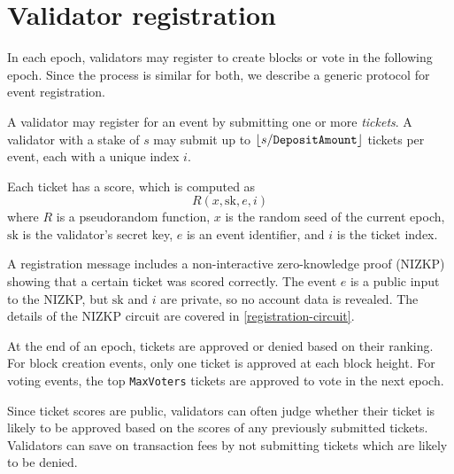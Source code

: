 \section{Validator registration}
\label{registration}


In each epoch, validators may register to create blocks or vote in the following epoch. Since the process is similar for both, we describe a generic protocol for event registration.

A validator may register for an event by submitting one or more \emph{tickets}. A validator with a stake of $s$ may submit up to $\lfloor s / \mathtt{DepositAmount}\rfloor$ tickets per event, each with a unique index $i$.

Each ticket has a score, which is computed as
\[ R(x, \mathrm{sk}, e, i) \]
where $R$ is a pseudorandom function, $x$ is the random seed of the current epoch, $\mathrm{sk}$ is the validator's secret key, $e$ is an event identifier, and $i$ is the ticket index.

A registration message includes a non-interactive zero-knowledge proof (NIZKP) showing that a certain ticket was scored correctly. The event $e$ is a public input to the NIZKP, but $\mathrm{sk}$ and $i$ are private, so no account data is revealed. The details of the NIZKP circuit are covered in \autoref{registration-circuit}.

At the end of an epoch, tickets are approved or denied based on their ranking. For block creation events, only one ticket is approved at each block height. For voting events, the top \texttt{MaxVoters} tickets are approved to vote in the next epoch.

Since ticket scores are public, validators can often judge whether their ticket is likely to be approved based on the scores of any previously submitted tickets. Validators can save on transaction fees by not submitting tickets which are likely to be denied.
